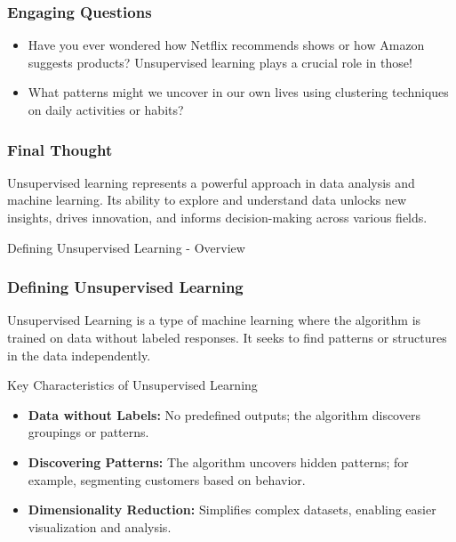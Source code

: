 \documentclass[aspectratio=169]{beamer}
\begin{document}
\begin{frame}[fragile]
    \frametitle{Engaging Questions}
    \begin{itemize}
        \item Have you ever wondered how Netflix recommends shows or how Amazon suggests products? Unsupervised learning plays a crucial role in those!
        \item What patterns might we uncover in our own lives using clustering techniques on daily activities or habits?
    \end{itemize}
\end{frame}

\begin{frame}[fragile]
    \frametitle{Final Thought}
    Unsupervised learning represents a powerful approach in data analysis and machine learning. Its ability to explore and understand data unlocks new insights, drives innovation, and informs decision-making across various fields.
\end{frame}

\begin{frame}[fragile]{Defining Unsupervised Learning - Overview}
    \frametitle{Defining Unsupervised Learning}
    Unsupervised Learning is a type of machine learning where the algorithm is trained on data without labeled responses. It seeks to find patterns or structures in the data independently.
\end{frame}

\begin{frame}[fragile]{Key Characteristics of Unsupervised Learning}
    \begin{itemize}
        \item \textbf{Data without Labels:} No predefined outputs; the algorithm discovers groupings or patterns.
        \item \textbf{Discovering Patterns:} The algorithm uncovers hidden patterns; for example, segmenting customers based on behavior.
        \item \textbf{Dimensionality Reduction:} Simplifies complex datasets, enabling easier visualization and analysis.
    \end{itemize}
\end{frame}
\end{document}
